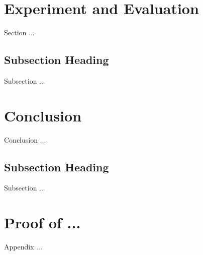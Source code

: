 \documentclass[journal]{IEEEtran}
\begin{document}
\section{Experiment and Evaluation}
Section ...


\subsection{Subsection Heading}
Subsection ...















\section{Conclusion}
Conclusion ...


\subsection{Subsection Heading}
Subsection ...












\appendices
\section{Proof of ...}
Appendix ...
\end{document}
